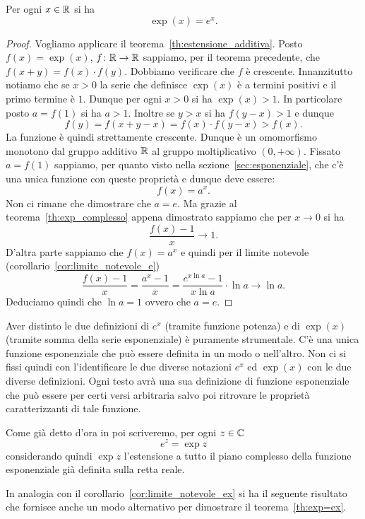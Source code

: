 \begin{theorem}%
\label{th:exp=ex}%
%
\mymark{***}%
Per ogni $x\in {\mathbb R}$ si ha
\[
  \exp(x) = e^x.
\]
\end{theorem}
%
\begin{proof}\mymark{**}
Vogliamo applicare il teorema~\ref{th:estensione_additiva}.
Posto $f(x)=\exp(x)$, $f\colon {\mathbb R}\to{\mathbb R}$ sappiamo,
per il teorema precedente, che $f(x+y)=f(x)\cdot f(y)$.
Dobbiamo verificare che $f$ è crescente.
Innanzitutto notiamo che se $x> 0$ la serie che definisce
$\exp(x)$ è a termini positivi e il primo termine è $1$.
Dunque per ogni $x> 0$ si ha $\exp(x)>1$.
In particolare posto $a=f(1)$ si ha $a>1$.
Inoltre se $y>x$ si ha $f(y-x)>1$ e dunque
\[
 f(y) = f(x+y-x) = f(x)\cdot f(y-x) > f(x).
\]
La funzione è quindi strettamente crescente. 
Dunque è un omomorfismo monotono dal gruppo additivo ${\mathbb R}$ al 
gruppo moltiplicativo $(0,+\infty)$.
Fissato $a=f(1)$ sappiamo,
per quanto visto nella sezione~\ref{sec:esponenziale},
che c'è una unica funzione con queste proprietà e dunque 
deve essere: 
\[
  f(x)= a^x.
\]
Non ci rimane che dimostrare che $a=e$.
Ma grazie al teorema~\ref{th:exp_complesso}
appena dimostrato sappiamo che per $x\to 0$ si ha
\[
  \frac{f(x)-1}{x}\to 1.
\]
D'altra parte sappiamo che $f(x)=a^x$ e quindi
per il limite notevole (corollario~\ref{cor:limite_notevole_e})
\[
\frac{f(x)-1}{x} = \frac{a^{x}-1}{x}
= \frac{e^{x \ln a}-1}{x \ln a} \cdot \ln a
\to \ln a.
\]
Deduciamo quindi che $\ln a= 1$ ovvero che $a=e$.
\end{proof}

Aver distinto le due definizioni di $e^x$ (tramite funzione potenza) e di $\exp(x)$ (tramite somma della serie esponenziale) è puramente strumentale.
C'è una unica funzione esponenziale che può essere definita in
un modo o nell'altro. Non ci si fissi quindi con l'identificare
le due diverse notazioni $e^x$ ed $\exp(x)$ con le due diverse definizioni.
Ogni testo avrà una sua definizione di funzione esponenziale che può
essere per certi versi arbitraria salvo poi ritrovare le proprietà
caratterizzanti di tale funzione.

Come già detto d'ora in poi scriveremo, per ogni $z\in {\mathbb C}$
\[
  e^z = \exp z
\]
considerando quindi $\exp z$ l'estensione a tutto il piano complesso
della funzione esponenziale già definita
sulla retta reale.

In analogia con il corollario~\ref{cor:limite_notevole_ex}
si ha il seguente risultato che fornisce anche un 
modo alternativo per dimostrare il teorema~\ref{th:exp=ex}.

